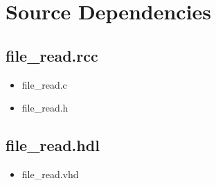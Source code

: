 \documentclass{article}
\def\comp{file\_read}
\begin{document}
\section*{Source Dependencies}
\subsection*{\comp.rcc}
\begin{itemize}
\item file\_read.c
\item file\_read.h
\end{itemize}
\subsection*{\comp.hdl}
\begin{itemize}
\item file\_read.vhd
\end{itemize}
\end{document}
